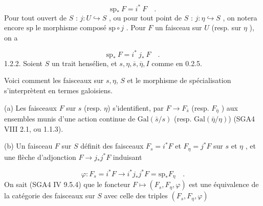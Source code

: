 \begin{equation}\tag{1.2.1.1}
\mathrm{sp}_* \ F = i^* \ F \quad .
\end{equation}
Pour tout ouvert de $S$ : $j : U \hookrightarrow S$ , ou pour tout point de $S$ : $j : \eta \hookrightarrow S$ , on notera encore $\mathrm{sp}$ le morphisme composé $\mathrm{sp} \circ j$ . Pour $F$ un faisceau sur $U$ (resp. sur $\eta$ ), on a

\begin{equation}\tag{1.2.1.2}
\mathrm{sp}_* \ F = i^* \ j_* \ F \quad .
\end{equation}
1.2.2. Soient $S$ un trait hensélien, et $s, \eta, \overline{s}, \overline{\eta}, I$ comme en 0.2.5.

\begin{center}
\end{center}


Voici comment les faisceaux sur $s,\eta$, $S$ et le morphisme de spécialisation s'interprètent en termes galoisiens.

(a) Les faisceaux $F$ sur $s$ (resp. $\eta$) s'identifient, par $F \longrightarrow F_{\bar{s}}$ (resp. $F_{\bar{\eta}}$ ) aux ensembles munis d'une action continue de $\mathrm{Gal}(\bar{s}/s)$ (resp. $\mathrm{Gal}(\bar{\eta}/\eta)$) (SGA4 VIII 2.1, ou 1.1.3).

(b) Un faisceau $F$ sur $S$ définit des faisceaux $F_s = i^* F$ et $F_\eta = j^* F$ sur $s$ et $\eta$ , et une flèche d'adjonction $F \longrightarrow j_* j^* F$ induisant

\begin{equation*}
\varphi : F_s = i^* F \longrightarrow i^* j_* j^* F = \mathrm{sp}_* F_\eta \quad .
\end{equation*}
On sait (SGA4 IV 9.5.4) que le foncteur $F \longmapsto (F_s, F_\eta, \varphi)$ est une équivalence de la catégorie des faisceaux sur $S$ avec celle des triples $(F_s, F_\eta, \varphi)$

